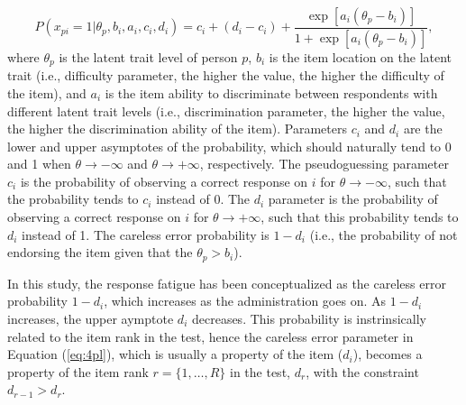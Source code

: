 \documentclass{svproc}
\begin{document}
\begin{equation}\label{eq:4pl}
	P(x_{pi}= 1| \theta_p, b_i, a_i, c_i, d_i) = c_i + (d_i -c_i) + \dfrac{\exp[a_i(\theta_p - b_i)]}{1 + \exp[a_i(\theta_p - b_i)]},
\end{equation}
where $\theta_p$ is the latent trait level of person $p$, $b_i$ is the item location on the latent trait (i.e., difficulty parameter, the higher the value, the higher the difficulty of the item), and $a_i$ is the item ability to discriminate between respondents with different latent trait levels (i.e., discrimination parameter, the higher the value, the higher the discrimination ability of the item). Parameters $c_i$ and $d_i$ are the lower and upper asymptotes of the probability, which should naturally tend to 0 and 1 when $\theta \to - \infty$ and $\theta \to +\infty$, respectively. 
The pseudoguessing parameter $c_i$ is the probability of observing a correct response on $i$ for $\theta \to - \infty$, such that the probability tends to $c_i$ instead of 0. 
The $d_i$ parameter is the probability of observing a correct response on $i$ for $\theta \to + \infty$, such that this probability tends to $d_i$ instead of 1. The careless error probability is $1 - d_i$ (i.e., the probability of not endorsing the item given that the $\theta_p > b_i$).



In this study, the response fatigue has been conceptualized as the careless error probability $1 - d_i$, which increases as the administration goes on. As $1 - d_i$ increases, the upper aymptote $d_i$ decreases.
This probability is instrinsically related to the item rank in the test, hence the careless error parameter in Equation (\ref{eq:4pl}), which is usually a property of the item ($d_i$), becomes a property of the item rank $r = \{1, \ldots, R\}$ in the test, $d_r$, with the constraint $d_{r-1} > d_r$. 
\end{document}
